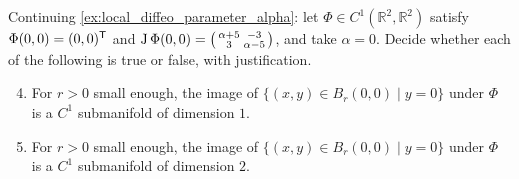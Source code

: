 \begin{exercise}
\label{ex:image_of_segment_submanifold}
Continuing \cref{ex:local_diffeo_parameter_alpha}: let $\Phi \in C^1(\mathbb{R}^2,\mathbb{R}^2)$
satisfy $\Phi(0,0) = (0,0)^{\mathsf{T}}$ and
$\operatorname{J}\Phi(0,0) = \left(\begin{smallmatrix} \alpha+5 & -3 \\ 3 & \alpha-5\end{smallmatrix}\right)$,
and take $\alpha = 0$. Decide whether each of the following is true or false, with justification.
\begin{enumerate}[label=\textbf{(\alph*)}]
  \setcounter{enumi}{3}
  \item For $r > 0$ small enough, the image of $\{(x,y) \in B_r(0,0) \mid y = 0\}$ under $\Phi$ is
    a $C^1$ submanifold of dimension $1$.
  \item For $r > 0$ small enough, the image of $\{(x,y) \in B_r(0,0) \mid y = 0\}$ under $\Phi$ is
    a $C^1$ submanifold of dimension $2$.
\end{enumerate}
\end{exercise}

